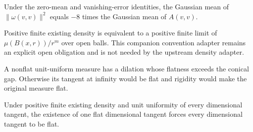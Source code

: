 \begin{lemma}
\label{lem:rigidity-omega-contraction}

Under the zero-mean and vanishing-error identities, the Gaussian mean of $\lVert\omega(v,v)\rVert^2$ equals $-8$ times the Gaussian mean of $A(v,v)$.
\end{lemma}

\begin{lemma}
\label{lem:density-open-ball-bridge}

Positive finite existing density is equivalent to a positive finite limit of $\mu(B(x,r))/r^m$ over open balls. This companion convention adapter remains an explicit open obligation and is not needed by the upstream density adapter.
\end{lemma}

\begin{lemma}
\label{lem:nonflat-uniform-large-flatness}

A nonflat unit-uniform measure has a dilation whose flatness exceeds the conical gap. Otherwise its tangent at infinity would be flat and rigidity would make the original measure flat.
\end{lemma}

\begin{lemma}
\label{lem:all-dimensional-tangents-flat}

Under positive finite existing density and unit uniformity of every dimensional tangent, the existence of one flat dimensional tangent forces every dimensional tangent to be flat.
\end{lemma}
